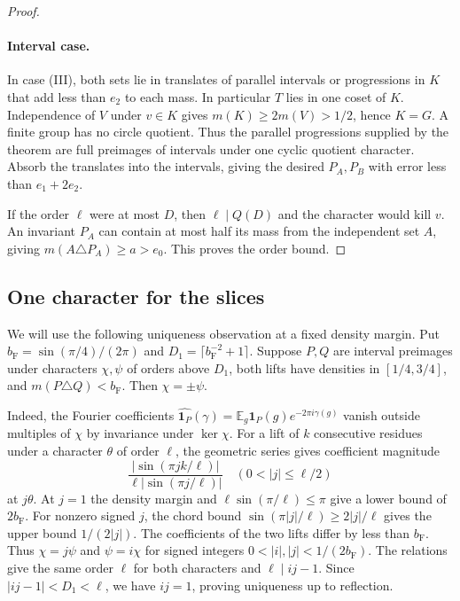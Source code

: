 \documentclass[11pt,reqno]{amsart}
\newcommand{\E}{\mathbb E}
\newcommand{\ind}{\mathbf 1}
\numberwithin{equation}{section}
\begin{document}
\begin{proof}
\paragraph{Interval case.}
In case (III), both sets lie in translates of parallel intervals
or progressions in \(K\) that add less than \(e_2\) to each mass.
In particular \(T\) lies in one coset of \(K\). Independence of
\(V\) under \(v\in K\) gives \(m(K)\ge2m(V)>1/2\), hence \(K=G\).
A finite group has no circle quotient. Thus the parallel
progressions supplied by the theorem are full preimages of intervals
under one cyclic quotient character. Absorb the translates into the
intervals, giving the desired \(P_A,P_B\) with error less than
\(e_1+2e_2\).

If the order \(\ell\) were at most \(D\), then \(\ell\mid Q(D)\) and the
character would kill \(v\). An invariant \(P_A\) can contain at most
half its mass from the independent set \(A\), giving
\(m(A\triangle P_A)\ge a>e_0\). This proves the order bound.
\end{proof}

\subsection{One character for the slices}\label{sec:common-character}

We will use the following uniqueness observation at a fixed density
margin. Put \(b_{\mathrm F}=\sin(\pi/4)/(2\pi)\) and
\(D_1=\lceil b_{\mathrm F}^{-2}+1\rceil\). Suppose \(P,Q\) are interval
preimages under characters \(\chi,\psi\) of orders above \(D_1\),
both lifts have densities in \([1/4,3/4]\), and
\(m(P\triangle Q)<b_{\mathrm F}\). Then \(\chi=\pm\psi\).

Indeed, the Fourier coefficients
\(\widehat{\ind_P}(\gamma)=\E_g\ind_P(g)e^{-2\pi i\gamma(g)}\)
vanish outside multiples of \(\chi\) by invariance under
\(\ker\chi\). For a lift of \(k\) consecutive residues under
a character \(\theta\) of order \(\ell\), the geometric series gives
coefficient magnitude
\[
 \frac{|\sin(\pi j k/\ell)|}{\ell|\sin(\pi j/\ell)|}
 \quad (0<|j|\le \ell/2)
\]
at \(j\theta\). At \(j=1\) the density margin and
\(\ell\sin(\pi/\ell)\le\pi\) give a lower bound of \(2b_{\mathrm F}\).
For nonzero signed \(j\), the chord bound
\(\sin(\pi |j|/\ell)\ge2|j|/\ell\) gives the upper bound \(1/(2|j|)\).
The coefficients of the two lifts differ by less than \(b_{\mathrm F}\).
Thus \(\chi=j\psi\) and \(\psi=i\chi\) for signed integers
\(0<|i|,|j|<1/(2b_{\mathrm F})\). The relations give the same order \(\ell\)
for both characters and \(\ell\mid ij-1\). Since \(|ij-1|<D_1<\ell\),
we have \(ij=1\), proving uniqueness up to reflection.
\end{document}
